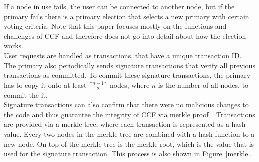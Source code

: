  If a node in use fails, the user can be connected to another node, but if the primary fails there is a primary election that selects a new primary with certain voting criteria. Note that this paper focuses mostly on the functions and challenges of CCF and therefore does not go into detail about how the election works. \\
 User requests are handled as transactions, that have a unique transaction ID. The primary also periodically sends signature transactions that verify all previous transactions as committed. To commit these signature transactions, the primary has to copy it onto at least $\lceil\frac{n-1}{2}\rceil$ nodes, where $n$ is the number of all nodes, to commit the it.\\
  Signature transactions can also confirm that there were no malicious changes to the code and thus guarantee the integrity of CCF via merkle proof~\cite{merkle}. Transactions are provided via a merkle tree, where each transaction is represented as a hash value. Every two nodes in the merkle tree are combined with a hash function to a new node. On top of the merkle tree is the merkle root, which is the value that is used for the signature transaction. This process is also shown in Figure~\ref{merkle}.\\
  
